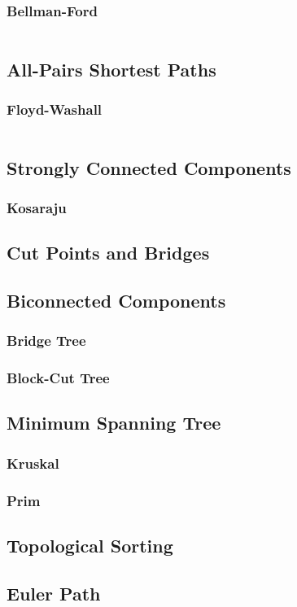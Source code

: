 \documentclass[8pt,a4paper,landscape,oneside]{amsart}
\newcommand{\code}[1]{\inputminted[fontsize=\normalsize,baselinestretch=1]{cpp}{_code/#1}}
\begin{document}
\begin{multicols*}{3}
		\subsubsection{Bellman-Ford}
			\code{graphs/bellman_ford.cpp}
	\subsection{All-Pairs Shortest Paths}
		\subsubsection{Floyd-Washall}
			\code{graphs/floyd_warshall.cpp}
	\subsection{Strongly Connected Components}
		\subsubsection{Kosaraju}
	\subsection{Cut Points and Bridges}
	\subsection{Biconnected Components}
		\subsubsection{Bridge Tree}
		\subsubsection{Block-Cut Tree}
	\subsection{Minimum Spanning Tree}
		\subsubsection{Kruskal}
		\subsubsection{Prim}
	\subsection{Topological Sorting}
	\subsection{Euler Path}

\end{multicols*}
\end{document}
